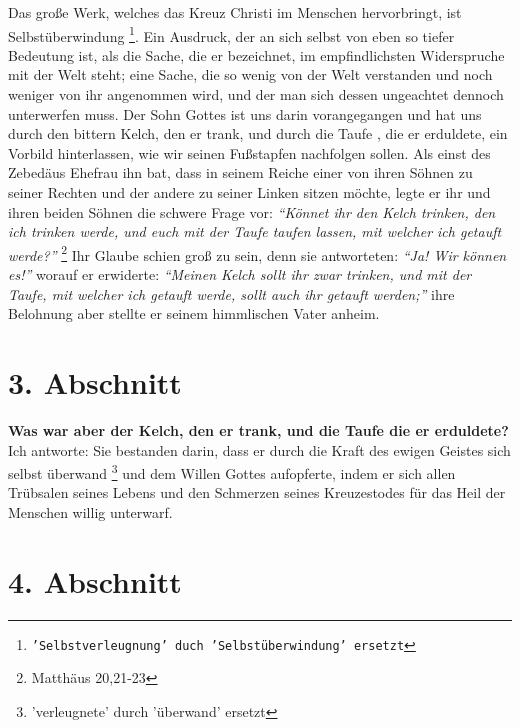 Das große Werk, welches das Kreuz Christi im Menschen hervorbringt, ist
Selbstüberwindung \footnote{\texttt{'Selbstverleugnung' duch 'Selbstüberwindung'
ersetzt}}. Ein Ausdruck, der an sich selbst von eben so tiefer Bedeutung
ist, als die Sache, die er bezeichnet, im empfindlichsten Widerspruche mit der
Welt steht; eine Sache, die so wenig von der Welt verstanden und noch weniger
von ihr angenommen wird, und der man sich dessen ungeachtet dennoch unterwerfen
muss. Der Sohn Gottes ist uns darin vorangegangen und hat uns durch den bittern
Kelch, den er trank, und durch die Taufe , die er erduldete, ein
Vorbild
hinterlassen, wie wir seinen Fußstapfen nachfolgen sollen. Als einst des
Zebedäus Ehefrau  ihn bat, dass in seinem
Reiche einer von ihren Söhnen zu
seiner Rechten und der andere zu seiner Linken sitzen möchte, legte er ihr und
ihren beiden Söhnen die schwere Frage vor:
\textit{"`Könnet ihr den Kelch trinken, den
ich trinken werde, und euch mit der Taufe taufen lassen, mit welcher ich
getauft werde?"'}
\footnote{Matthäus  20,21-23}
Ihr Glaube schien groß zu sein, denn
sie antworteten:\textit{ "`Ja! Wir können es!"'} worauf er erwiderte:
  \textit{"`Meinen Kelch
sollt ihr zwar trinken, und mit der Taufe, mit welcher ich getauft werde, sollt
auch ihr getauft werden;"'} ihre Belohnung aber stellte er seinem himmlischen
Vater anheim.

\section{3. Abschnitt} \label{kap4_ab3}

 
\textbf{Was war aber der Kelch, den er trank, und die Taufe die er erduldete?}
Ich
antworte: Sie bestanden darin, dass er durch die Kraft des ewigen Geistes sich
selbst überwand \footnote{'verleugnete' durch 'überwand' ersetzt} und dem
Willen Gottes aufopferte, indem er sich allen
Trübsalen seines Lebens und den Schmerzen seines Kreuzestodes für das Heil der
Menschen willig unterwarf.

\section{4. Abschnitt} \label{kap4_ab4}

